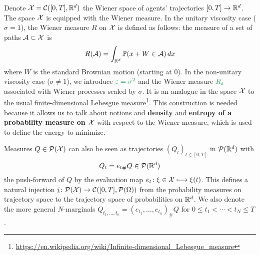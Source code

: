 \documentclass[../report.tex]{subfiles}
\begin{document}
Denote $\mathcal{X} = \mathcal{C}([0,T], \mathbb{R}^d)$ the Wiener space of agents' trajectories $[0,T] \to\mathbb{R}^d$. The space $\mathcal{X}$ is equipped with the Wiener measure.
In the unitary viscosity case ($\sigma = 1$), the Wiener measure $R$ on $\mathcal{X}$ is defined as follows: the measure of a set of paths $\mathcal{A} \subset \mathcal{X}$ is
\[
	R(\mathcal{A}) = \int_{\mathbb{R}^d}\mathbb{P}(x+W \in \mathcal{A})\, dx
\]
where $W$ is the standard Brownian motion (starting at $0$).
In the non-unitary viscosity case ($\sigma \neq 1$), we introduce $\greenfont\epsilon = \sigma^2$ and the Wiener measure $\greenfont R_\epsilon$ associated with Wiener processes scaled by $\sigma$.
It is an analogue in the space $\mathcal{X}$ to the usual finite-dimensional Lebesgue measure\footnote{\url{https://en.wikipedia.org/wiki/Infinite-dimensional_Lebesgue_measure}}. \cites{benamou:hal-01295299,benamou2015lagrangian} This construction is needed because it allows us to talk about notions and \textbf{density} and \textbf{entropy of a probability measure on $\mathcal{X}$} with respect to the Wiener measure, which is used to define the energy to minimize.


Measures $Q \in \mathcal{P}(\mathcal{X})$ can also be seen as trajectories $(Q_t)_{t\in[0,T]}$ in $\mathcal{P}(\mathbb{R}^d)$ with
\[
Q_t = e_{t\#}Q \in \mathcal{P}(\mathbb{R}^d)
\]
the push-forward of $Q$ by the evaluation map $e_t\colon \xi \in\mathcal{X}\longmapsto \xi(t)$. This defines a natural injection $\underline{i} \colon \mathcal{P}(\mathcal{X}) \rightarrow \mathcal{C}([0,T], \mathcal{P}(\Omega))$ from the probability measures on trajectory space to the trajectory space of probabilities on $\mathbb{R}^d$. We also denote the more general $N$-marginals $Q_{t_1,\ldots,t_n} = (e_{t_1},\ldots, e_{t_n})_\# Q$ for $0\leq t_1 < \cdots < t_N \leq T$.
\end{document}
